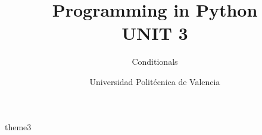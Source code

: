 \documentclass[fontsize=10pt,a4paper]{scrartcl}
\title{Programming in Python\\ UNIT 3}
\subtitle{\Large{Conditionals}}
\author{Universidad Politécnica de Valencia}
\date{\academicyear}
\begin{document}
\maketitle
\tableofcontents


{theme3}

\end{document}
